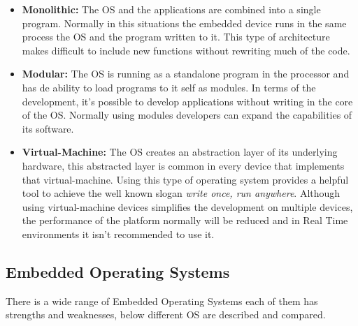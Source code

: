 \begin{itemize}
\item \textbf{Monolithic:} The OS and the applications are combined into a single program. Normally in this situations the embedded device runs in the same process the OS and the program written to it. This type of architecture makes difficult to include new functions without rewriting much of the code.

\item \textbf{Modular:} The OS is running as a standalone program in the processor and has de ability to load programs to it self as modules. In terms of the development, it's possible to develop applications without writing in the core of the OS. Normally using modules developers can expand the capabilities of its software.

\item \textbf{Virtual-Machine:} The OS creates an abstraction layer of its underlying hardware, this abstracted layer is common in every device that implements that virtual-machine. Using this type of operating system provides a helpful tool to achieve the well known slogan \textit{write once, run anywhere}. Although using virtual-machine devices simplifies the development on multiple devices, the performance of the platform normally will be reduced and in Real Time environments it isn't recommended to use it.
\end{itemize}

\subsection{Embedded Operating Systems}\label{Embedded-Operating-Systems}
There is a wide range of Embedded Operating Systems each of them has strengths and weaknesses, below different OS are described and compared.
 
